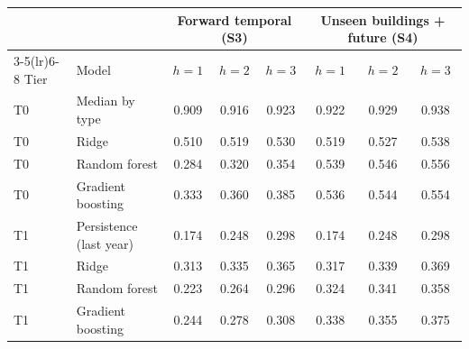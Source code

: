 \begin{tabular}{llcccccc}
\toprule
 & & \multicolumn{3}{c}{Forward temporal (S3)} & \multicolumn{3}{c}{Unseen buildings + future (S4)} \\
\cmidrule(lr){3-5}\cmidrule(lr){6-8}
Tier & Model & $h=1$ & $h=2$ & $h=3$ & $h=1$ & $h=2$ & $h=3$ \\
\midrule
T0 & Median by type & 0.909 & 0.916 & 0.923 & 0.922 & 0.929 & 0.938 \\
T0 & Ridge & 0.510 & 0.519 & 0.530 & 0.519 & 0.527 & 0.538 \\
T0 & Random forest & 0.284 & 0.320 & 0.354 & 0.539 & 0.546 & 0.556 \\
T0 & Gradient boosting & 0.333 & 0.360 & 0.385 & 0.536 & 0.544 & 0.554 \\
\midrule
T1 & Persistence (last year) & 0.174 & 0.248 & 0.298 & 0.174 & 0.248 & 0.298 \\
T1 & Ridge & 0.313 & 0.335 & 0.365 & 0.317 & 0.339 & 0.369 \\
T1 & Random forest & 0.223 & 0.264 & 0.296 & 0.324 & 0.341 & 0.358 \\
T1 & Gradient boosting & 0.244 & 0.278 & 0.308 & 0.338 & 0.355 & 0.375 \\
\bottomrule
\end{tabular}

